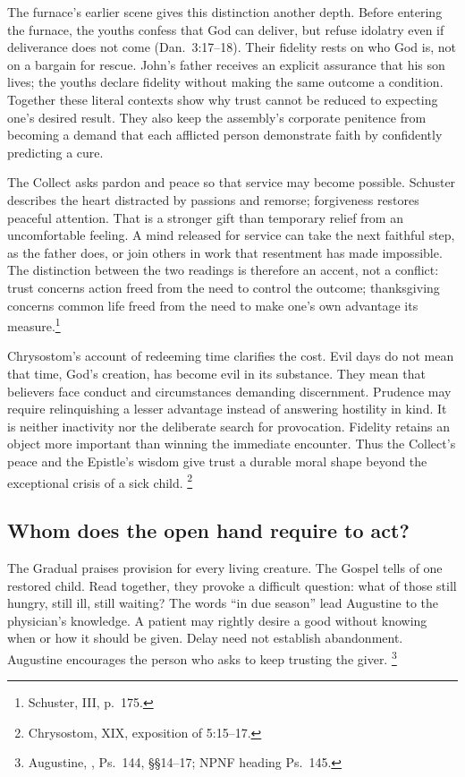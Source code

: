 The furnace's earlier scene gives this distinction another depth.
Before entering the furnace, the youths confess that God can deliver,
but refuse idolatry even if deliverance does not come (Dan.~3:17--18).
Their fidelity rests on who God is, not on a bargain for rescue.
John's father receives an explicit assurance that his son lives;
the youths declare fidelity without making the same outcome a
condition. Together these literal contexts show why trust cannot
be reduced to expecting one's desired result. They also keep the
assembly's corporate penitence from becoming a demand that each
afflicted person demonstrate faith by confidently predicting a cure.

The Collect asks pardon and peace so that service may become possible.
Schuster describes the heart distracted by passions and remorse;
forgiveness restores peaceful attention. That is a stronger gift than
temporary relief from an uncomfortable feeling. A mind released for
service can take the next faithful step, as the father does, or join
others in work that resentment has made impossible. The distinction
between the two readings is therefore an accent, not a conflict:
trust concerns action freed from the need to control the outcome;
thanksgiving concerns common life freed from the need to make one's
own advantage its measure.\footnote{Schuster, III, p.~175.}

Chrysostom's account of redeeming time clarifies the cost. Evil days
do not mean that time, God's creation, has become evil in its substance.
They mean that believers face conduct and circumstances demanding
discernment. Prudence may require relinquishing a lesser advantage
instead of answering hostility in kind. It is neither inactivity nor
the deliberate search for provocation. Fidelity retains an object
more important than winning the immediate encounter. Thus the Collect's
peace and the Epistle's wisdom give trust a durable moral shape beyond
the exceptional crisis of a sick child.
\footnote{Chrysostom, XIX, exposition of 5:15--17.}

\subsection{Whom does the open hand require to act?}
The Gradual praises provision for every living creature. The Gospel
tells of one restored child. Read together, they provoke a difficult
question: what of those still hungry, still ill, still waiting? The
words ``in due season'' lead Augustine to the physician's knowledge.
A patient may rightly desire a good without knowing when or how it
should be given. Delay need not establish abandonment. Augustine
encourages the person who asks to keep trusting the giver.
\footnote{Augustine, , Ps.~144,
\S\S14--17; NPNF heading Ps.~145.}

